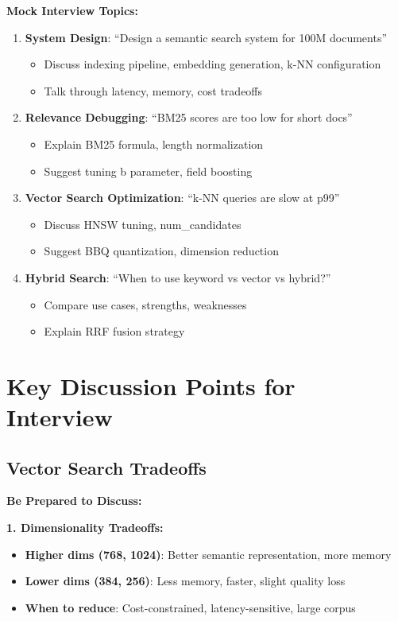 \documentclass[10pt]{article}
\begin{document}
\textbf{Mock Interview Topics:}
\begin{enumerate}
\item \textbf{System Design}: ``Design a semantic search system for 100M documents''
  \begin{itemize}
  \item Discuss indexing pipeline, embedding generation, k-NN configuration
  \item Talk through latency, memory, cost tradeoffs
  \end{itemize}

\item \textbf{Relevance Debugging}: ``BM25 scores are too low for short docs''
  \begin{itemize}
  \item Explain BM25 formula, length normalization
  \item Suggest tuning b parameter, field boosting
  \end{itemize}

\item \textbf{Vector Search Optimization}: ``k-NN queries are slow at p99''
  \begin{itemize}
  \item Discuss HNSW tuning, num\_candidates
  \item Suggest BBQ quantization, dimension reduction
  \end{itemize}

\item \textbf{Hybrid Search}: ``When to use keyword vs vector vs hybrid?''
  \begin{itemize}
  \item Compare use cases, strengths, weaknesses
  \item Explain RRF fusion strategy
  \end{itemize}
\end{enumerate}

\section{Key Discussion Points for Interview}

\subsection{Vector Search Tradeoffs}

\textbf{Be Prepared to Discuss:}

\textbf{1. Dimensionality Tradeoffs:}
\begin{itemize}
\item \textbf{Higher dims (768, 1024)}: Better semantic representation, more memory
\item \textbf{Lower dims (384, 256)}: Less memory, faster, slight quality loss
\item \textbf{When to reduce}: Cost-constrained, latency-sensitive, large corpus
\end{itemize}
\end{document}
